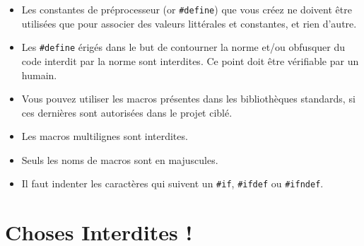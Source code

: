 \documentclass{42-fr}
\begin{document}
        \begin{itemize}

            \item Les constantes de préprocesseur (or \texttt{\#define}) que vous créez ne doivent
                être utilisées que pour associer des valeurs littérales et constantes, et rien d’autre.
            \item Les \texttt{\#define} érigés dans le but de contourner la norme et/ou obfusquer
                du code interdit par la norme sont interdites. 
                Ce point doit être vérifiable par un humain.
            \item Vous pouvez utiliser les macros présentes dans les bibliothèques standards,
                si ces dernières sont autorisées dans le projet ciblé.
            \item Les macros multilignes sont interdites.
            \item Seuls les noms de macros sont en majuscules.
            \item Il faut indenter les caractères qui suivent un \texttt{\#if}, \texttt{\#ifdef}
                ou \texttt{\#ifndef}.

        \end{itemize}
        \newpage


    \section{Choses Interdites !}
\end{document}
